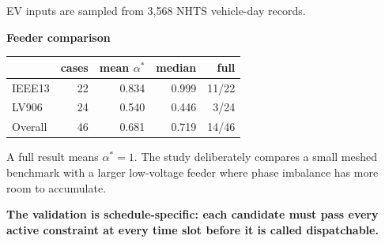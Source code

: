 \documentclass[final]{beamer}
\newcommand{\body}{\fontsize{29}{36}\selectfont}
\newcommand{\bodylarge}{\fontsize{33}{40}\selectfont}
\newcommand{\smallfont}{\fontsize{23}{28}\selectfont}
\begin{document}
\begin{frame}[t]
\begin{tcolorbox}[enhanced,colback=white,colframe=posterNavy,boxrule=2.3pt,
  arc=6pt,left=0.65cm,right=0.65cm,top=0.34cm,bottom=0.34cm]
\begin{minipage}[t]{0.31\linewidth}
    \vspace{0.08cm}
    {\color{posterMuted}\smallfont EV inputs are sampled from 3,568 NHTS vehicle-day records.\par}
  \end{minipage}\hfill
  \begin{minipage}[t]{0.31\linewidth}\vspace{0pt}
    {\color{posterGreen}\fontsize{31}{37}\selectfont\bfseries Feeder comparison\par}
    \vspace{0.10cm}
    \renewcommand{\arraystretch}{1.35}
    \setlength{\tabcolsep}{0.16cm}
    {\fontsize{24}{30}\selectfont
    \begin{tabular}{lrrrr}
      \toprule
      & cases & mean $\alpha^*$ & median & full\\
      \midrule
      IEEE13 & 22 & 0.834 & 0.999 & 11/22\\
      LV906  & 24 & 0.540 & 0.446 & 3/24\\
      Overall& 46 & 0.681 & 0.719 & 14/46\\
      \bottomrule
    \end{tabular}\par}
    \vspace{0.16cm}
    {\color{posterMuted}\body
    A full result means $\alpha^*=1$. The study deliberately compares a small meshed benchmark with a larger low-voltage feeder where phase imbalance has more room to accumulate.\par}
  \end{minipage}
  \vspace{0.16cm}
  \begin{tcolorbox}[colback=posterBlueSurface,colframe=posterTeal,boxrule=1.4pt,arc=4pt,
    left=0.35cm,right=0.35cm,top=0.18cm,bottom=0.18cm]
    \centering
    {\color{posterNavy}\bodylarge\bfseries The validation is schedule-specific: each candidate must pass every active constraint at every time slot before it is called dispatchable.\par}
  \end{tcolorbox}
\end{tcolorbox}

\vspace{0.22cm}


\end{frame}
\end{document}
